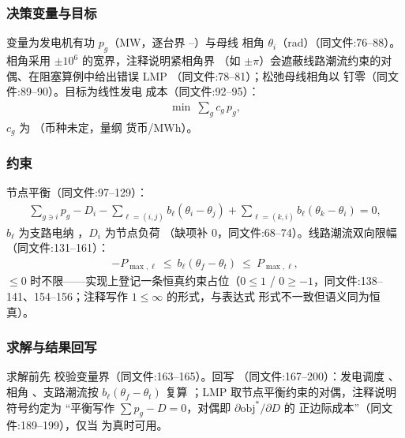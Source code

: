 \subsubsection*{决策变量与目标}
变量为发电机有功 $p_g$（MW，逐台界 --）与母线
相角 $\theta_i$（rad）（同文件:76--88）。相角采用 $\pm 10^{6}$ 的宽界，注释说明紧相角界
（如 $\pm\pi$）会遮蔽线路潮流约束的对偶、在阻塞算例中给出错误 LMP
（同文件:78--81）；松弛母线相角以  钉零（同文件:89--90）。目标为线性发电
成本（同文件:92--95）：
\begin{align*}
\min\ \sum_{g} c_g\,p_g ,
\end{align*}
$c_g$ 为 （币种未定，量纲 货币/MWh）。

\subsubsection*{约束}
节点平衡（同文件:97--129）：
\begin{align*}
\sum_{g\ni i} p_g - D_i - \sum_{\ell=(i,j)} b_\ell(\theta_i-\theta_j)
+ \sum_{\ell=(k,i)} b_\ell(\theta_k-\theta_i) = 0,
\end{align*}
$b_\ell$ 为支路电纳 ，$D_i$ 为节点负荷
（缺项补 0，同文件:68--74）。线路潮流双向限幅
（同文件:131--161）：
\begin{align*}
-P_{\max,\ell}\ \le\ b_\ell(\theta_f-\theta_t)\ \le\ P_{\max,\ell},
\end{align*}
$\le 0$ 时不限——实现上登记一条恒真约束占位（$0\le 1$ /
$0\ge -1$，同文件:138--141、154--156；注释写作 $1\le\infty$ 的形式，与表达式
形式不一致但语义同为恒真）。

\subsubsection*{求解与结果回写}
求解前先  校验变量界（同文件:163--165）。回写
（同文件:167--200）：发电调度 、相角
、支路潮流按 $b_\ell(\theta_f-\theta_t)$ 复算
；LMP 取节点平衡约束的对偶，注释说明符号约定为
“平衡写作 $\sum p_g - D = 0$，对偶即 $\partial\mathrm{obj}^{*}/\partial D$ 的
正边际成本”（同文件:189--199），仅当  为真时可用。

